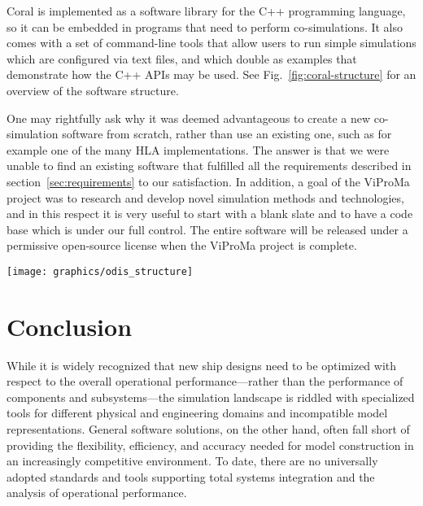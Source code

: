 \documentclass[prb,aps,showpacs,floatfix,twocolumn,10pt]{revtex4-1}
\newcommand{\cosimSW}{Coral}
\newlength{\graphicswidth}
\newlength{\graphicswidthfull}
\theoremstyle{plain}
\theoremstyle{remark}
\begin{document}
\cosimSW{} is implemented as a software library for the C++ programming language, so it can be embedded in programs that need to perform co-simulations.
It also comes with a set of command-line tools that allow users to run simple simulations which are configured via text files, and which double as examples that demonstrate how the C++ APIs may be used.
See Fig.\ \ref{fig:coral-structure} for an overview of the software structure.

One may rightfully ask why it was deemed advantageous to create a new co-simulation software from scratch, rather than use an existing one, such as for example one of the many HLA implementations.
The answer is that we were unable to find an existing software that fulfilled all the requirements described in section~\ref{sec:requirements} to our satisfaction.
In addition, a goal of the ViProMa project was to research and develop novel simulation methods and technologies, and in this respect it is very useful to start with a blank slate and to have a code base which is under our full control.
The entire software will be released under a permissive open-source license when the ViProMa project is complete.

\begin{figure*}[h!tb]
  \texttt{[image: graphics/odis\_structure]}
  \caption{%
    A diagram that shows the various components in a \cosimSW{} simulation.
    Everything inside the dashed rectangle is formally part of \cosimSW{}.
    By \emph{API/EXE} we mean that the functionality is offered both in the form of a C++ programming interface and as a ready-made executable application.
  }
  \label{fig:coral-structure}
\end{figure*}





\section{Conclusion}
\label{sec:conclusion}

While it is widely recognized that new ship designs need to be optimized with respect to the overall operational performance---rather than the performance of components and subsystems---the simulation landscape is riddled with specialized tools for different physical and engineering domains and incompatible model representations.
General software solutions, on the other hand, often fall short of providing the flexibility, efficiency, and accuracy needed for model construction in an increasingly competitive environment.
To date, there are no universally adopted standards and tools supporting total systems integration and the analysis of operational performance.
\end{document}
